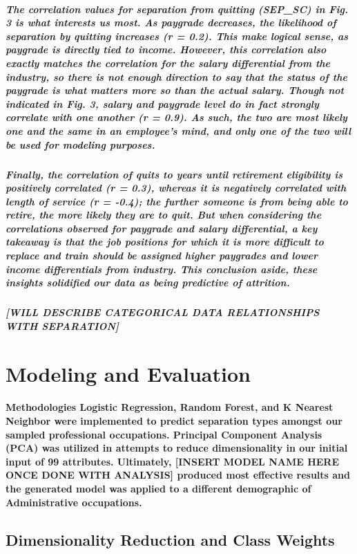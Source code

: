 \documentclass{article}
\begin{document}
\subparagraph{The correlation values for separation from quitting (SEP\_SC) in Fig. 3 is what interests us most.  As paygrade decreases, the likelihood of separation by quitting increases (r = 0.2). This make logical sense, as paygrade is directly tied to income.  However, this correlation also exactly matches the correlation for the salary differential from the industry, so there is not enough direction to say that the status of the paygrade is what matters more so than the actual salary. Though not indicated in Fig. 3, salary and paygrade level do in fact strongly correlate with one another (r = 0.9). As such, the two are most likely one and the same in an employee's mind, and only one of the two will be used for modeling purposes.}
 
\subparagraph{Finally, the correlation of quits to years until retirement eligibility is positively correlated (r = 0.3), whereas it is negatively correlated with length of service (r = -0.4); the further someone is from being able to retire, the more likely they are to quit. But when considering the correlations observed for paygrade and salary differential, a key takeaway is that the job positions for which it is more difficult to replace and train should be assigned higher paygrades and lower income differentials from industry. This conclusion aside, these insights solidified our data as being predictive of attrition.}

\subparagraph{[WILL DESCRIBE CATEGORICAL DATA RELATIONSHIPS WITH SEPARATION]}

\section{Modeling and Evaluation}

\paragraph{Methodologies Logistic Regression, Random Forest, and K Nearest Neighbor were implemented to predict separation types amongst our sampled professional occupations. Principal Component Analysis (PCA) was utilized in attempts to reduce dimensionality in our initial input of 99 attributes. Ultimately, [INSERT MODEL NAME HERE ONCE DONE WITH ANALYSIS] produced most effective results and the generated model was applied to a different demographic of Administrative occupations.}
 
\subsection{Dimensionality Reduction and Class Weights}
\end{document}
